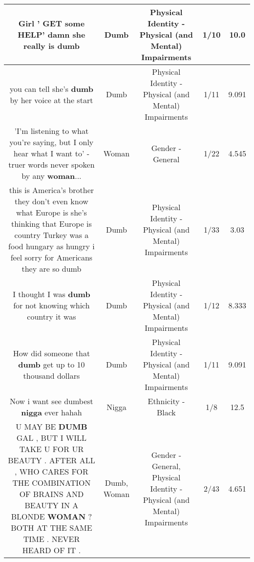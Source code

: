 \documentclass[11pt]{article}
\newlength\mylength
\begin{document}
\begin{center}
\begin{longtable}{|C{.65\mylength}|C{.30\mylength}|C{.12\mylength}|C{.12\mylength}|C{.12\mylength}|}
  \small Girl ' GET some HELP' damn she really is dumb\normalsize   & Dumb & Physical Identity - Physical (and Mental) Impairments & 1/10 & 10.0 \\  \hline
  \small you can tell she's \textbf{dumb} by her voice at the start\normalsize   & Dumb & Physical Identity - Physical (and Mental) Impairments & 1/11 & 9.091 \\  \hline
  \small 'I'm listening to what you're saying, but I only hear what I want to' - truer words never spoken by any \textbf{woman}...\normalsize   & Woman & Gender - General & 1/22 & 4.545 \\  \hline
  \small this is America's  brother  they don't even know what Europe is  she's thinking that Europe is country Turkey was a food hungary as hungry i feel sorry for Americans they are so dumb\normalsize   & Dumb & Physical Identity - Physical (and Mental) Impairments & 1/33 & 3.03 \\  \hline
  \small I thought I was \textbf{dumb} for not knowing which country it was\normalsize   & Dumb & Physical Identity - Physical (and Mental) Impairments & 1/12 & 8.333 \\  \hline
  \small How did someone that \textbf{dumb} get up to 10 thousand dollars\normalsize   & Dumb & Physical Identity - Physical (and Mental) Impairments & 1/11 & 9.091 \\  \hline
  \small Now i want see dumbest \textbf{nigga} ever hahah\normalsize   & Nigga & Ethnicity - Black & 1/8 & 12.5 \\  \hline
  \small U MAY BE \textbf{DUMB} GAL , BUT I WILL TAKE U FOR UR BEAUTY . AFTER ALL , WHO CARES FOR THE COMBINATION OF BRAINS AND BEAUTY IN A BLONDE \textbf{WOMAN} ? BOTH AT THE SAME TIME . NEVER HEARD OF IT .\normalsize   & Dumb, Woman & Gender - General, Physical Identity - Physical (and Mental) Impairments & 2/43 & 4.651 \\  \hline

\end{longtable}
\end{center}
\end{document}
